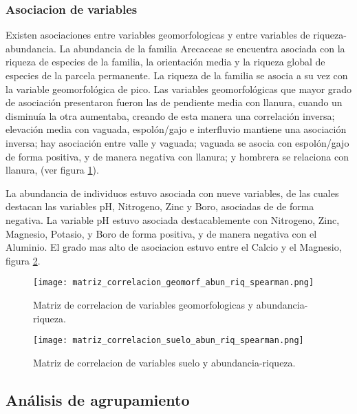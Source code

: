 \documentclass[11pt,]{article}
\begin{document}
\subsubsection{Asociacion de variables}\label{asociacion-de-variables}

Existen asociaciones entre variables geomorfologicas y entre variables
de riqueza-abundancia. La abundancia de la familia Arecaceae se
encuentra asociada con la riqueza de especies de la familia, la
orientación media y la riqueza global de especies de la parcela
permanente. La riqueza de la familia se asocia a su vez con la variable
geomorfológica de pico. Las variables geomorfológicas que mayor grado de
asociación presentaron fueron las de pendiente media con llanura, cuando
un disminuía la otra aumentaba, creando de esta manera una correlación
inversa; elevación media con vaguada, espolón/gajo e interfluvio
mantiene una asociación inversa; hay asociación entre valle y vaguada;
vaguada se asocia con espolón/gajo de forma positiva, y de manera
negativa con llanura; y hombrera se relaciona con llanura, (ver figura
\ref{fig:matriz_correlacion_geomorf_abun_riq_spearman}).

La abundancia de individuos estuvo asociada con nueve variables, de las
cuales destacan las variables pH, Nitrogeno, Zinc y Boro, asociadas de
de forma negativa. La variable pH estuvo asociada destacablemente con
Nitrogeno, Zinc, Magnesio, Potasio, y Boro de forma positiva, y de
manera negativa con el Aluminio. El grado mas alto de asociacion estuvo
entre el Calcio y el Magnesio, figura
\ref{fig:matriz_correlacion_suelo_abun_riq_spearman}.

\begin{figure}
\centering
\texttt{[image: matriz\_correlacion\_geomorf\_abun\_riq\_spearman.png]}
\caption{Matriz de correlacion de variables geomorfologicas y
abundancia-riqueza.
\label{fig:matriz_correlacion_geomorf_abun_riq_spearman}}
\end{figure}

\begin{figure}
\centering
\texttt{[image: matriz\_correlacion\_suelo\_abun\_riq\_spearman.png]}
\caption{Matriz de correlacion de variables suelo y abundancia-riqueza.
\label{fig:matriz_correlacion_suelo_abun_riq_spearman}}
\end{figure}

\subsection{Análisis de agrupamiento}\label{anuxe1lisis-de-agrupamiento}
\end{document}
